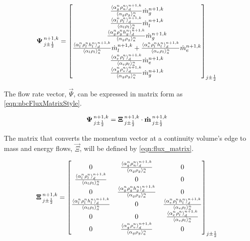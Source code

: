 \begin{equation}
\label{eqn:nbcFluxDefinition}
\vec{\Psi}^{n+1, k}_{j \pm \onehalf} = \begin{bmatrix}
\frac{\don{\alpha^{n}_{g} \rho^{n}_{n}}^{n+1,k}_{d}}{\ave{\alpha_{g} \rho_{g}}^{n}_{a}}\dot{m}^{n+1,k}_{g} \\
%
\frac{\don{\alpha^{n}_{l}\rho^{n}_{l}}^{n+1,k}_{d}}{\ave{\alpha_{l} \rho_{l}}^{n}_{a}}\dot{m}^{n+1,k}_{l}\\
%
\frac{\don{\alpha^{n}_{g} \rho^{n}_{g} h^{n}_{g}}^{n+1,k}_{d}}{\ave{\alpha_{g} \rho_{g}}^{n}_{a}}\dot{m}^{n+1, k}_{g}\\
%
\frac{\don{\alpha^{n}_{l}\rho^{n}_{l} h^{n}_{l}}^{n+1,k}_{d}}{\ave{\alpha_{l} \rho_{l}}^{n}_{a}}\dot{m}^{n+1, k}_{l} +\frac{\don{\alpha^{n}_{e} \rho^{n}_{l} h^{n}_{l}}^{n+1, k}_{d}}{\ave{\alpha_{e} \rho_{l}}^{n}_{a}}\dot{m}^{n+1, k}_{e} \\
%
\frac{ \don{\alpha^{n}_{e} \rho^{n}_{l}}^{n+1, k}_{d}}{ \ave{\alpha_{e} \rho_{l}}^{n}_{a}} \dot{m}^{n+1, k}_{e} \\
%
\frac{ \don{\alpha^{n}_{g} \rho^{n}_{v}}^{n+1, k}_{d}}{ \ave{\alpha_{g} \rho_{g}}^{n}_{a}} \dot{m}^{n+1, k}_{g}
\end{bmatrix}_{j \pm \onehalf}
\end{equation}

The flow rate vector, $\vec{\Psi}$, can be expressed in matrix form as \eqref{eqn:nbcFluxMatrixStyle}.

\begin{equation}
\label{eqn:nbcFluxMatrixStyle}
\vec{\Psi}^{n+1, k}_{j \pm \onehalf} = \vec{\Xi}^{n+1, k}_{j \pm \onehalf} \cdot \vec{\dot{m}}^{n+1, k}_{j \pm \onehalf}
\end{equation}

The matrix that converts the momentum vector at a continuity volume's edge to mass and energy flows, $\vec{\Xi}$, will be defined by \eqref{eqn:flux_matrix}.

\begin{equation}
\label{eqn:flux_matrix}
\vec{\Xi}^{n+1, k}_{j \pm \onehalf} = \begin{bmatrix}
%
 0 & \frac{\don{\alpha^{n}_{g} \rho^{n}_{n}}^{n+1,k}_{d}}{\ave{\alpha_{g} \rho_{g}}^{n}_{a}} & 0 \\
%
\frac{\don{\alpha^{n}_{l}\rho^{n}_{l}}^{n+1,k}_{d}}{\ave{\alpha_{l} \rho_{l}}^{n}_{a}} & 0 & 0 \\
%
0 & \frac{\don{\alpha^{n}_{g} \rho^{n}_{g} h^{n}_{g}}^{n+1,k}_{d}}{\ave{\alpha_{g} \rho_{g}}^{n}_{a}} & 0 \\
%
\frac{\don{\alpha^{n}_{l}\rho^{n}_{l} h^{n}_{l}}^{n+1,k}_{d}}{\ave{\alpha_{l} \rho_{l}}^{n}_{a}} & 0 & \frac{\don{\alpha^{n}_{e} \rho^{n}_{l} h^{n}_{l}}^{n+1, k}_{d}}{\ave{\alpha_{e} \rho_{l}}^{n}_{a}} \\
%
0 & 0 & \frac{ \don{\alpha^{n}_{e} \rho^{n}_{l}}^{n+1, k}_{d}}{ \ave{\alpha_{e} \rho_{l}}^{n}_{a}} \\
%
0 & \frac{ \don{\alpha^{n}_{g} \rho^{n}_{v}}^{n+1, k}_{d}}{ \ave{\alpha_{g} \rho_{g}}^{n}_{a}} & 0
\end{bmatrix}_{j \pm \onehalf}
\end{equation}

